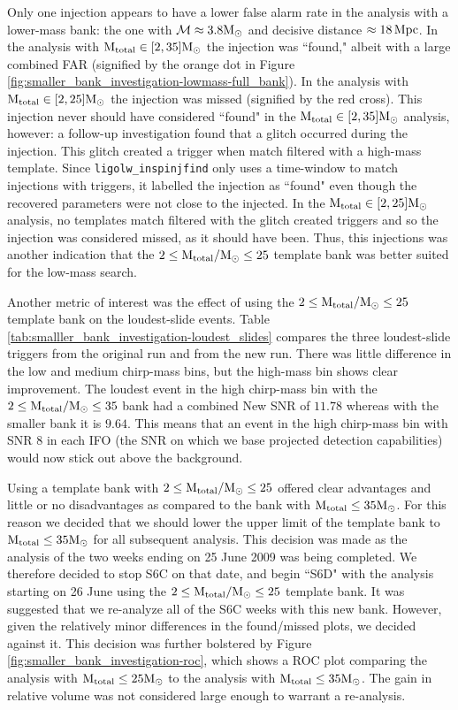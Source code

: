 Only one injection appears to have a lower false alarm rate in the analysis
with a lower-mass bank: the one with $\mathcal{M} \approx 3.8\mathrm{M_\odot}$ and decisive
distance $\approx 18\,\mathrm{Mpc}$. In the analysis with $\mathrm{M_{total}} \in [2,35]\mathrm{M_\odot}$ the
injection was ``found," albeit with a large combined \ac{FAR} (signified by the
orange dot in Figure \ref{fig:smaller_bank_investigation-lowmass-full_bank}).
In the analysis with $\mathrm{M_{total}} \in [2,25]\mathrm{M_\odot}$ the injection was missed
(signified by the red cross). This injection never should have considered
``found" in the $\mathrm{M_{total}} \in [2,35]\mathrm{M_\odot}$ analysis, however: a follow-up
investigation found that a glitch occurred during the injection. This glitch
created a trigger when match filtered with a high-mass template. Since
\texttt{ligolw\_inspinjfind} only uses a time-window to match injections with
triggers, it labelled the injection as ``found" even though the recovered
parameters were not close to the injected. In the $\mathrm{M_{total}} \in [2,25]\mathrm{M_\odot}$
analysis, no templates match filtered with the glitch created triggers and so
the injection was considered missed, as it should have been. Thus, this
injections was another indication that the $2 \leq \mathrm{M_{total}}/\mathrm{M_\odot} \leq 25$
template bank was better suited for the low-mass search.

Another metric of interest was the effect of using the $2 \leq \mathrm{M_{total}}/\mathrm{M_\odot}
\leq 25$ template bank on the loudest-slide events. Table
\ref{tab:smalller_bank_investigation-loudest_slides} compares the three
loudest-slide triggers from the original run and from the new run. There was
little difference in the low and medium chirp-mass bins, but the high-mass bin
shows clear improvement. The loudest event in the high chirp-mass bin with the
$2 \leq \mathrm{M_{total}}/\mathrm{M_\odot} \leq 35$ bank had a combined New \ac{SNR} of $11.78$
whereas with the smaller bank it is $9.64$. This means that an event in the
high chirp-mass bin with \ac{SNR} $8$ in each \ac{IFO} (the \ac{SNR} on which
we base projected detection capabilities) would now stick out above the
background.

Using a template bank with $2 \leq \mathrm{M_{total}}/\mathrm{M_\odot} \leq 25$ offered clear
advantages and little or no disadvantages as compared to the bank with $\mathrm{M_{total}}
\leq 35\mathrm{M_\odot}$. For this reason we decided that we should lower the upper limit
of the template bank to $\mathrm{M_{total}} \leq 35\mathrm{M_\odot}$ for all subsequent analysis.
This decision was made as the analysis of the two weeks ending on 25 June 2009
was being completed. We therefore decided to stop S6C on that date, and begin
``S6D" with the analysis starting on 26 June using the $2 \leq \mathrm{M_{total}}/\mathrm{M_\odot}
\leq 25$ template bank. It was suggested that we re-analyze all of the S6C
weeks with this new bank. However, given the relatively minor differences in
the found/missed plots, we decided against it. This decision was further
bolstered by Figure \ref{fig:smaller_bank_investigation-roc}, which shows a ROC
plot comparing the analysis with $\mathrm{M_{total}} \leq 25\mathrm{M_\odot}$ to the analysis with
$\mathrm{M_{total}} \leq 35\mathrm{M_\odot}$. The gain in relative volume was not considered large
enough to warrant a re-analysis.

